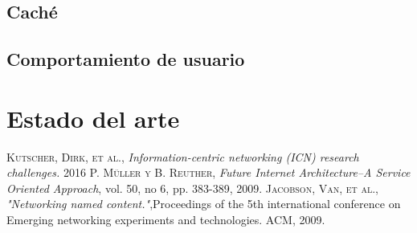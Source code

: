 \documentclass[12pt]{ociamthesis}  %
\begin{document}
\section{Caché}


\section{Comportamiento de usuario}


\chapter{Estado del arte}



\begin{thebibliography}{a}
	 \textsc{Kutscher, Dirk, et al.},
	\textit{Information-centric networking (ICN) research challenges.} 2016
	 \textsc{P. Müller y B. Reuther},
	\textit{Future Internet Architecture–A Service Oriented Approach}, vol. 50, no 6, pp. 383-389, 2009.
	 \textsc{Jacobson, Van, et al.},
	\textit{"Networking named content."},Proceedings of the 5th international conference on Emerging networking experiments and technologies. ACM, 2009.
\end{thebibliography}
\end{document}
